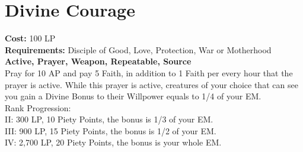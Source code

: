 \section{Divine Courage}\label{prayer:divineCourage}
\textbf{Cost:} 100 LP\\
\textbf{Requirements:} Disciple of Good, Love, Protection, War or Motherhood\\
\textbf{Active, Prayer, Weapon, Repeatable, Source}\\
Pray for 10 AP and pay 5 Faith, in addition to 1 Faith per every hour that the prayer is active.
While this prayer is active, creatures of your choice that can see you gain a Divine Bonus to their Willpower equals to 1/4 of your EM.
\\
Rank Progression:\\
II: 300 LP, 10 Piety Points, the bonus is 1/3 of your EM.\\
III: 900 LP, 15 Piety Points, the bonus is 1/2 of your EM.\\
IV: 2,700 LP, 20 Piety Points, the bonus is your whole EM.\\